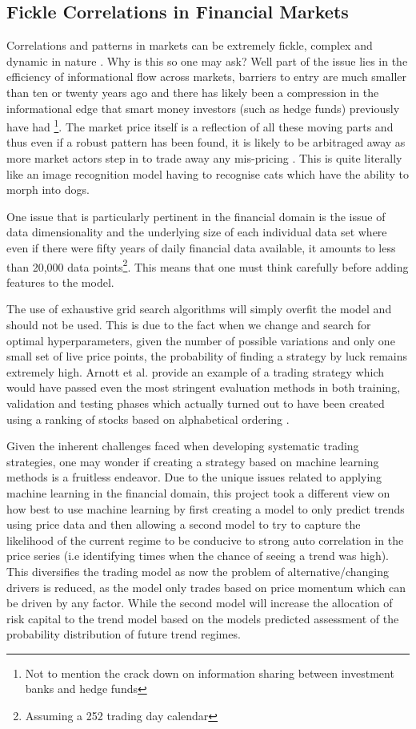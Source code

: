 \documentclass[11pt]{article}
\begin{document}
\subsection{Fickle Correlations in Financial Markets}
Correlations and patterns in markets can be extremely fickle, complex and dynamic in nature \cite{Camargo2013}. Why is this so one may ask? Well part of the issue lies in the efficiency of informational flow across markets, barriers to entry are much smaller than ten or twenty years ago and there has likely been a compression in the informational edge that smart money investors (such as hedge funds) previously have had \cite{hedgefundRets}\footnote{Not to mention the crack down on information sharing between investment banks and hedge funds}. The market price itself is a reflection of all these moving parts and thus even if a robust pattern has been found, it is likely to be arbitraged away as more market actors step in to trade away any mis-pricing \cite{Bartram2019}. This is quite literally like an image recognition model having to recognise cats which have the ability to morph into dogs.
\par
One issue that is particularly pertinent in the financial domain is the issue of data dimensionality and the underlying size of each individual data set where even if there were fifty years of daily financial data available, it amounts to less than 20,000 data points\footnote{Assuming a 252 trading day calendar}. This means that one must think carefully before adding features to the model.\par The use of exhaustive grid search algorithms will simply overfit the model and should not be used. This is due to the fact when we change and search for optimal hyperparameters, given the number of possible variations and only one small set of live price points, the probability of finding a strategy by luck remains extremely high. Arnott et al. provide an example of a trading strategy which would have passed even the most stringent evaluation methods in both training, validation and testing phases which actually turned out to have been created using a ranking of stocks based on alphabetical ordering \cite{Arnott2018}.
\par
Given the inherent challenges faced when developing systematic trading strategies, one may wonder if creating a strategy based on machine learning methods is a fruitless endeavor. Due to the unique issues related to applying machine learning in the financial domain, this project took a different view on how best to use machine learning by first creating a model to only predict trends using price data and then allowing a second model to try to capture the likelihood of the current regime to be conducive to strong auto correlation in the price series (i.e identifying times when the chance of seeing a trend was high). This diversifies the trading model as now the problem of alternative/changing drivers is reduced, as the model only trades based on price momentum which can be driven by any factor. While the second model will increase the allocation of risk capital to the trend model based on the models predicted assessment of the probability distribution of future trend regimes.
\clearpage
\end{document}
